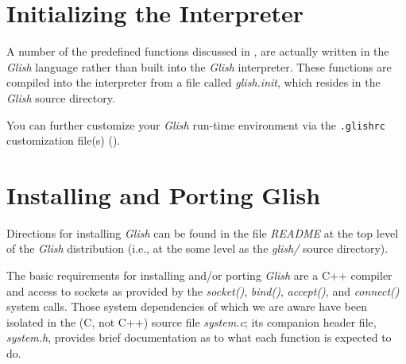 \begin{sloppy}
\begin{list}{}{}
\end{list}

\section{Initializing the Interpreter}
\label{glish-init}

A number of the predefined functions discussed in ,
are actually written in the {\em Glish} language rather than built into the
{\em Glish} interpreter.  These functions are compiled into the interpreter
from a file called
{\em glish.init\/}, which resides in the {\em Glish} source directory.

You can further customize your {\em Glish} run-time environment via the
{\tt .glishrc} customization file(s) ().

\section{Installing and Porting Glish}
\label{installation}

Directions for installing {\em Glish} can be found in the file
{\em README} at the top level of the {\em Glish} distribution
(i.e., at the some level as the {\em glish/} source directory).

The basic requirements for installing and/or porting {\em Glish} are a C++
compiler and access to sockets as provided by the {\em socket()\/},
{\em bind()\/}, {\em accept()\/}, and {\em connect()\/} system
calls.  Those system dependencies of which we are aware have been
isolated in the (C, not C++) source file {\em system.c\/}; its
companion header file, {\em system.h\/}, provides brief documentation
as to what each function is expected to do.

\end{sloppy}
